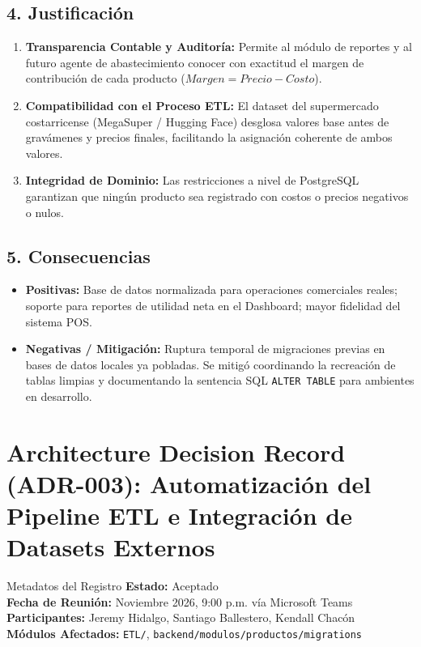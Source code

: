 \documentclass[11pt,a4paper]{article}
\begin{document}
\subsection{4. Justificación}
\begin{enumerate}
    \item \textbf{Transparencia Contable y Auditoría:} Permite al módulo de reportes y al futuro agente de abastecimiento conocer con exactitud el margen de contribución de cada producto ($Margen = Precio - Costo$).
    \item \textbf{Compatibilidad con el Proceso ETL:} El dataset del supermercado costarricense (MegaSuper / Hugging Face) desglosa valores base antes de gravámenes y precios finales, facilitando la asignación coherente de ambos valores.
    \item \textbf{Integridad de Dominio:} Las restricciones a nivel de PostgreSQL garantizan que ningún producto sea registrado con costos o precios negativos o nulos.
\end{enumerate}

\subsection{5. Consecuencias}
\begin{itemize}[leftmargin=*]
    \item \textbf{Positivas:} Base de datos normalizada para operaciones comerciales reales; soporte para reportes de utilidad neta en el Dashboard; mayor fidelidad del sistema POS.
    \item \textbf{Negativas / Mitigación:} Ruptura temporal de migraciones previas en bases de datos locales ya pobladas. Se mitigó coordinando la recreación de tablas limpias y documentando la sentencia SQL \texttt{ALTER TABLE} para ambientes en desarrollo.
\end{itemize}

\newpage

\section{Architecture Decision Record (ADR-003): Automatización del Pipeline ETL e Integración de Datasets Externos}

\begin{adrbox}{Metadatos del Registro}
\textbf{Estado:} Aceptado \\
\textbf{Fecha de Reunión:} Noviembre 2026, 9:00 p.m. vía Microsoft Teams \\
\textbf{Participantes:} Jeremy Hidalgo, Santiago Ballestero, Kendall Chacón \\
\textbf{Módulos Afectados:} \texttt{ETL/}, \texttt{backend/modulos/productos/migrations}
\end{adrbox}
\end{document}
